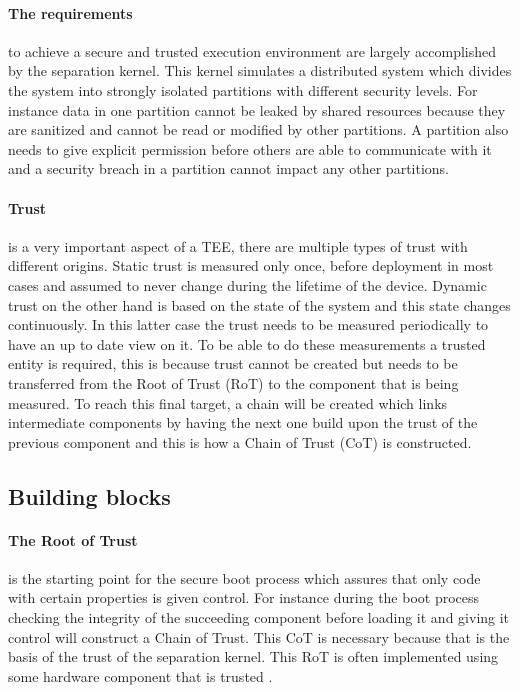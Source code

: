 \paragraph*{The requirements} 
to achieve a secure and trusted execution environment are largely accomplished by the separation kernel. This kernel simulates a distributed system which divides the system into strongly isolated partitions with different security levels. For instance data in one partition cannot be leaked by shared resources because they are sanitized and cannot be read or modified by other partitions. A partition also needs to give explicit permission before others are able to communicate with it and a security breach in a partition cannot impact any other partitions. 

\paragraph*{Trust}
is a very important aspect of a TEE, there are multiple types of trust with different origins. Static trust is measured only once, before deployment in most cases and assumed to never change during the lifetime of the device. Dynamic trust on the other hand is based on the state of the system and this state changes continuously. In this latter case the trust needs to be measured periodically to have an up to date view on it. To be able to do these measurements a trusted entity is required, this is because trust cannot be created but needs to be transferred from the Root of Trust (RoT) to the component that is being measured. To reach this final target, a chain will be created which links intermediate components by having the next one build upon the trust of the previous component and this is how a Chain of Trust (CoT) is constructed.

\subsection*{Building blocks}

\paragraph*{The Root of Trust}
is the starting point for the secure boot process which assures that only code with certain properties is given control. For instance during the boot process checking the integrity of the succeeding component before loading it and giving it control will construct a Chain of Trust. This CoT is necessary because that is the basis of the trust of the separation kernel. This RoT is often implemented using some hardware component that is trusted \cite{MATSUMOTOTsutomu2021SCUa} \cite{FotiadisGeorgios2021RAfS} \cite{2006Tpmb} \cite{ZhaoShijun2021RoRo}.

